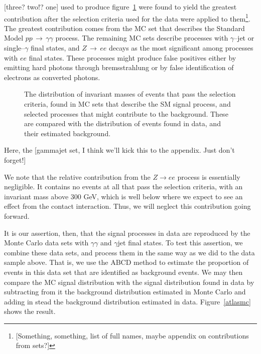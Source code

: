 [three? two!? one\textinterrobang\textinterrobang] used to produce figure~\ref{mclist} were found to yield the greatest contribution after the selection criteria used for the data were applied to them\footnote{[Something, something, list of full names, maybe appendix on contributions from sets?]}. The greatest contribution comes from the MC set that describes the Standard Model $pp\,\rightarrow\,\gamma\gamma$ process. The remaining MC sets describe processes with $\gamma$--jet or single--$\gamma$ final states, and  $Z\,\rightarrow\,ee$ decays as the most significant among processes with $ee$ final states. These processes might produce false positives either by emitting hard photons through bremsstrahlung or by false identification of electrons as converted photons.

\begin{figure}[htp]
\begin{minipage}[b]{.69\textwidth}
\begin{infilsf} \tiny

\end{infilsf}
\end{minipage}
\begin{minipage}[b]{.3\textwidth}
\caption{The distribution of invariant masses of events that pass the selection criteria, found in \atlas{} MC sets that describe the SM signal process, and selected processes that might contribute to the background. These are compared with the distribution of events found in data, and their estimated background.}\label{mclist}
\end{minipage}
\end{figure}

Here, the [gammajet set, I think we'll kick this to the appendix. Just don't forget!]

We note that the relative contribution from the $Z\rightarrow ee$ process is essentially negligible. It contains no events at all that pass the selection criteria, with an invariant mass above 300 GeV, which is well below where we expect to see an effect from the contact interaction. Thus, we will neglect this contribution going forward.

It is our assertion, then, that the signal processes in data are reproduced by the \atlas{} Monte Carlo data sets with $\gamma\gamma$ and $\gamma$jet final states. To test this assertion, we combine these data sets, and process them in the same way as we did to the data sample above. That is, we use the ABCD method to estimate the proportion of events in this data set that are identified as background events. We may then compare the MC signal distribution with the signal distribution found in data by subtracting from it the background distribution estimated in Monte Carlo and adding in stead the background distribution estimated in data. Figure~\ref{atlasmc} shows the result.

